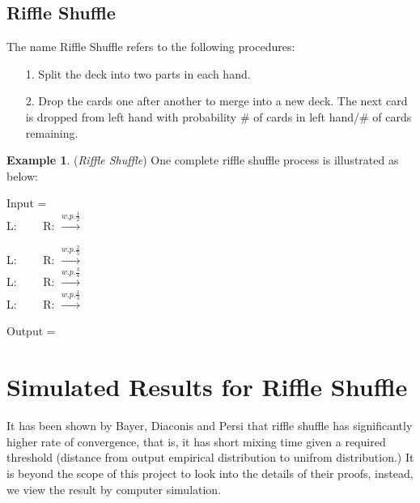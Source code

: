 \documentclass[a4paper, 11pt]{article}
\theoremstyle{definition}
\newtheorem{example}{Example}
\begin{document}
\subsection{Riffle Shuffle}
The name Riffle Shuffle refers to the following procedures:
\begin{itemize}
  \item[1.] Split the deck into two parts in each hand.
  \item[2.] Drop the cards one after another to merge into a new deck. The next card is dropped from left hand with probability \# of cards in left hand/\# of cards remaining.
\end{itemize}
\begin{example} (\textit{Riffle Shuffle})  One complete riffle shuffle process is illustrated as below:
\begin{center}
  Input = \\
  L: ~~~~R:  $\xrightarrow{w.p. \frac{1}{2}}$ \cardslot\\
\end{center}

\begin{center}
  L: ~~~~R:  $\xrightarrow{w.p. \frac{2}{5}}$ \cardslot\\
  L: ~~~~R:  $\xrightarrow{w.p. \frac{3}{4}}$ \cardslot\\
  L: ~~~~R:  $\xrightarrow{w.p. \frac{1}{3}}$ \cardslot\\
  \end{center}

\begin{center}
 Output = \\
\end{center}
\end{example}


\section{Simulated Results for Riffle Shuffle}
It has been shown by Bayer, Diaconis and Persi\cite{bayer} that riffle shuffle has significantly higher rate of convergence, that is, it has short mixing time given a required threshold (distance from output empirical distribution to unifrom distribution.) It is beyond the scope of this project to look into the details of their proofs, instead, we view the result by computer simulation. 
\end{document}
